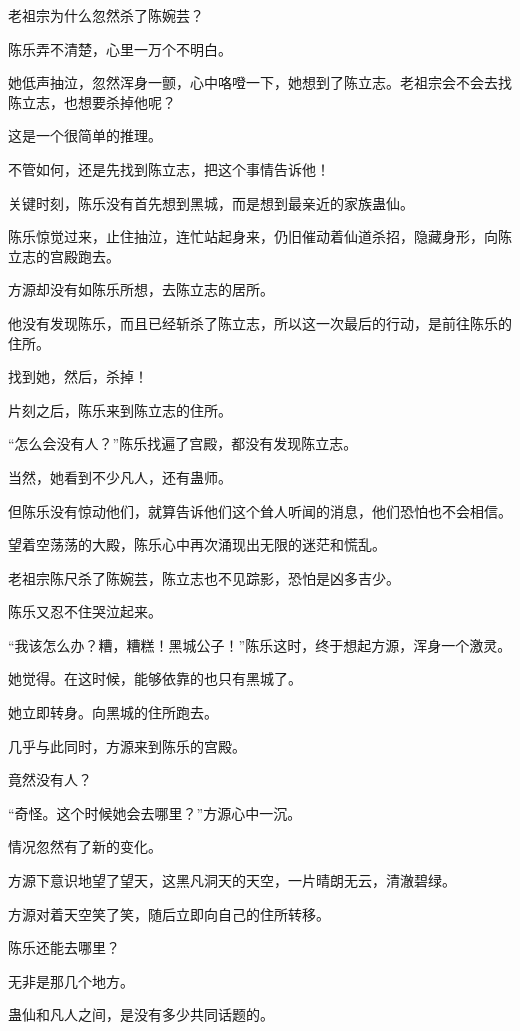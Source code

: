 
\begin{this_body}

老祖宗为什么忽然杀了陈婉芸？

陈乐弄不清楚，心里一万个不明白。

她低声抽泣，忽然浑身一颤，心中咯噔一下，她想到了陈立志。老祖宗会不会去找陈立志，也想要杀掉他呢？

这是一个很简单的推理。

不管如何，还是先找到陈立志，把这个事情告诉他！

关键时刻，陈乐没有首先想到黑城，而是想到最亲近的家族蛊仙。

陈乐惊觉过来，止住抽泣，连忙站起身来，仍旧催动着仙道杀招，隐藏身形，向陈立志的宫殿跑去。

方源却没有如陈乐所想，去陈立志的居所。

他没有发现陈乐，而且已经斩杀了陈立志，所以这一次最后的行动，是前往陈乐的住所。

找到她，然后，杀掉！

片刻之后，陈乐来到陈立志的住所。

“怎么会没有人？”陈乐找遍了宫殿，都没有发现陈立志。

当然，她看到不少凡人，还有蛊师。

但陈乐没有惊动他们，就算告诉他们这个耸人听闻的消息，他们恐怕也不会相信。

望着空荡荡的大殿，陈乐心中再次涌现出无限的迷茫和慌乱。

老祖宗陈尺杀了陈婉芸，陈立志也不见踪影，恐怕是凶多吉少。

陈乐又忍不住哭泣起来。

“我该怎么办？糟，糟糕！黑城公子！”陈乐这时，终于想起方源，浑身一个激灵。

她觉得。在这时候，能够依靠的也只有黑城了。

她立即转身。向黑城的住所跑去。

几乎与此同时，方源来到陈乐的宫殿。

竟然没有人？

“奇怪。这个时候她会去哪里？”方源心中一沉。

情况忽然有了新的变化。

方源下意识地望了望天，这黑凡洞天的天空，一片晴朗无云，清澈碧绿。

方源对着天空笑了笑，随后立即向自己的住所转移。

陈乐还能去哪里？

无非是那几个地方。

蛊仙和凡人之间，是没有多少共同话题的。


\end{this_body}
